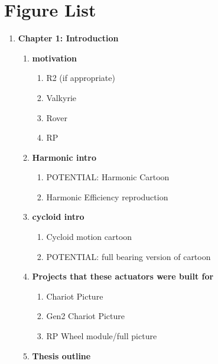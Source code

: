 \section{Figure List}

\begin{enumerate}
	\item \textbf{Chapter 1: Introduction} 
	\begin{enumerate}
		\item \textbf{motivation}
		\begin{enumerate}
			\item
			R2 (if appropriate)
			\item
			Valkyrie
			\item
			Rover
			\item
			RP
		\end{enumerate}

		\item \textbf{Harmonic intro}
		\begin{enumerate}
			\item POTENTIAL: Harmonic Cartoon
			\item Harmonic Efficiency reproduction
		\end{enumerate}

		\item \textbf{cycloid intro}
		\begin{enumerate}
			\item Cycloid motion cartoon 
			\item POTENTIAL: full bearing version of cartoon
		\end{enumerate}

		\item \textbf{Projects that these actuators were built for}
		\begin{enumerate}
			\item Chariot Picture
			\item Gen2 Chariot Picture
			\item RP Wheel module/full picture
		\end{enumerate}

		\item \textbf{Thesis outline}
		\begin{enumerate}
		\end{enumerate}
			
	\end{enumerate}


\end{enumerate}

